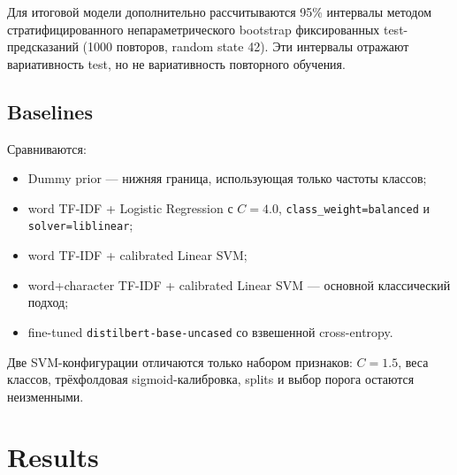 \documentclass{article}
\begin{document}
Для итоговой модели дополнительно рассчитываются 95\% интервалы методом
стратифицированного непараметрического bootstrap фиксированных test-предсказаний
(1000 повторов, random state 42). Эти интервалы отражают вариативность test,
но не вариативность повторного обучения.

\subsection{Baselines}
Сравниваются:
\begin{itemize}
\item Dummy prior --- нижняя граница, использующая только частоты классов;
\item word TF-IDF + Logistic Regression с $C=4.0$,
\texttt{class\_weight=balanced} и \texttt{solver=liblinear};
\item word TF-IDF + calibrated Linear SVM;
\item word+character TF-IDF + calibrated Linear SVM --- основной классический подход;
\item fine-tuned \texttt{distilbert-base-uncased} со взвешенной cross-entropy.
\end{itemize}
Две SVM-конфигурации отличаются только набором признаков: $C=1.5$, веса классов,
трёхфолдовая sigmoid-калибровка, splits и выбор порога остаются неизменными.

\section{Results}
\begin{table}[tbh!]
\centering
{}
\caption{Результаты всех подходов.}
\label{tab:results}
\end{table}
\end{document}
